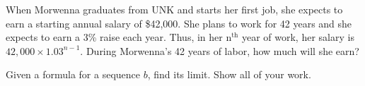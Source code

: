 \documentclass[12pt]{exam}
\begin{document}
\begin{questions}
\begin{solution}[2.0in]
\end{solution}
\question[2] When Morwenna graduates from UNK and starts her first job, she expects to earn a 
   starting annual salary of \$42,000. She plans to work for 42 years
   and she expects to earn a 3\% raise each year. Thus, in her 
   $\mathrm{n}^{\mathrm{th}}$  year 
   of work, her salary is $42,000 \times 1.03^{n-1}$. During 
   Morwenna's 42 years of labor, how much will she earn?

   \begin{solution}[2.5in]
   
    
   \end{solution}

   \question Given a formula for a sequence $b$, find its limit.
   Show all of your work.

    





\end{questions}
\end{document}
